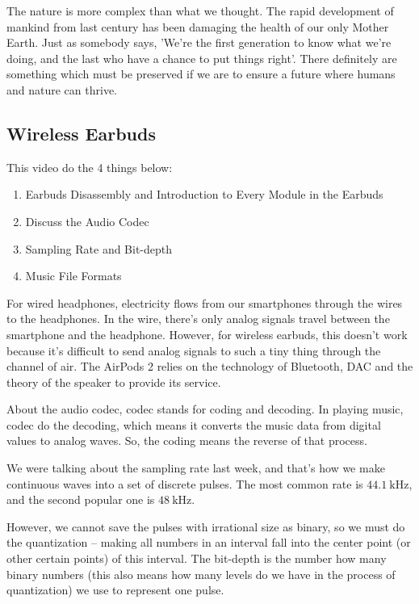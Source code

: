 \documentclass{article}
\begin{document}
The nature is more complex than what we thought. The rapid development of mankind from last century has been damaging the health of our only Mother Earth. Just as somebody says, 'We're the first generation to know what we're doing, and the last who have a chance to put things right'. There definitely are something which must be preserved if we are to ensure a future where humans and nature can thrive.

\subsection{Wireless Earbuds}

This video do the 4 things below:

\begin{enumerate}
    \item 
    Earbuds Disassembly and Introduction to Every Module in the Earbuds
    \item 
    Discuss the Audio Codec
    \item 
    Sampling Rate and Bit-depth
    \item 
    Music File Formats
\end{enumerate}

For wired headphones, electricity flows from our smartphones through the wires to the headphones. In the wire, there's only analog signals travel between the smartphone and the headphone. However, for wireless earbuds, this doesn't work because it's difficult to send analog signals to such a tiny thing through the channel of air. The AirPods 2 relies on the technology of Bluetooth, DAC and the theory of the speaker to provide its service. 

About the audio codec, codec stands for coding and decoding. In playing music, codec do the decoding, which means it converts the music data from digital values to analog waves. So, the coding means the reverse of that process.

We were talking about the sampling rate last week, and that's how we make continuous waves into a set of discrete pulses. The most common rate is $44.1~\mathrm{kHz}$, and the second popular one is $48~\mathrm{kHz}$.

However, we cannot save the pulses with irrational size as binary, so we must do the quantization -- making all numbers in an interval fall into the center point (or other certain points) of this interval. The bit-depth is the number how many binary numbers (this also means how many levels do we have in the process of quantization) we use to represent one pulse.
\end{document}
